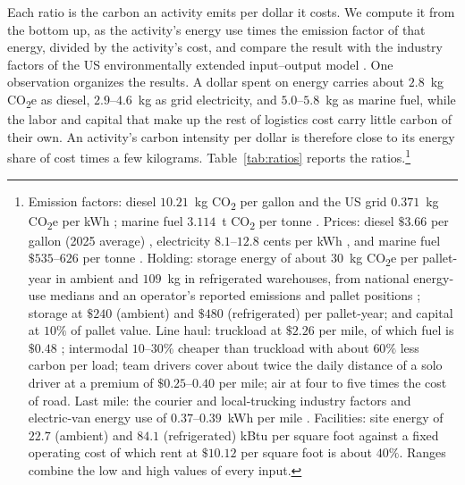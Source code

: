 \documentclass[11pt]{article}
\theoremstyle{definition}
\theoremstyle{remark}
\theoremstyle{plain}
\begin{document}
Each ratio is the carbon an activity emits per dollar it costs. We compute it from the bottom up, as the
activity's energy use times the emission factor of that energy, divided by the activity's cost, and compare
the result with the industry factors of the US environmentally extended input--output model
\citep{epa2024useeio}. One observation organizes the results. A dollar spent on energy carries about
$2.8$~kg CO\textsubscript{2}e as diesel, $2.9$--$4.6$~kg as grid electricity, and $5.0$--$5.8$~kg as marine
fuel, while the labor and capital that make up the rest of logistics cost carry little carbon of their own. An
activity's carbon intensity per dollar is therefore close to its energy share of cost times a few kilograms.
Table~\ref{tab:ratios} reports the ratios.\footnote{Emission factors: diesel $10.21$~kg CO\textsubscript{2}
per gallon and the US grid $0.371$~kg CO\textsubscript{2}e per kWh \citep{epa2022ghghub}; marine fuel
$3.114$~t CO\textsubscript{2} per tonne \citep{eu2016mrv}. Prices: diesel $\$3.66$ per gallon (2025 average)
\citep{eia2026diesel}, electricity $8.1$--$12.8$ cents per kWh \citep{eia2025electricity}, and marine fuel
$\$535$--$626$ per tonne \citep{shipbunker2025}. Holding: storage energy of about $30$~kg
CO\textsubscript{2}e per pallet-year in ambient and $109$~kg in refrigerated warehouses, from national
energy-use medians \citep{energystar2024medians} and an operator's reported emissions and pallet positions
\citep{lineage2024prospectus}; storage at $\$240$ (ambient) and $\$480$ (refrigerated) per pallet-year; and
capital at $10\%$ of pallet value. Line haul: truckload at $\$2.26$ per mile, of which fuel is $\$0.48$
\citep{atri2025costs}; intermodal $10$--$30\%$ cheaper than truckload with about $60\%$ less carbon per load;
team drivers cover about twice the daily distance of a solo driver at a premium of $\$0.25$--$0.40$ per mile;
air at four to five times the cost of road. Last mile: the courier and local-trucking industry factors
\citep{epa2024useeio} and electric-van energy use of $0.37$--$0.39$~kWh per mile \citep{mulholland2022vans}.
Facilities: site energy of $22.7$ (ambient) and $84.1$ (refrigerated) kBtu per square foot
\citep{energystar2024medians} against a fixed operating cost of which rent at $\$10.12$ per square foot
\citep{cushman2025industrial} is about $40\%$. Ranges combine the low and high values of every input.}
\end{document}
